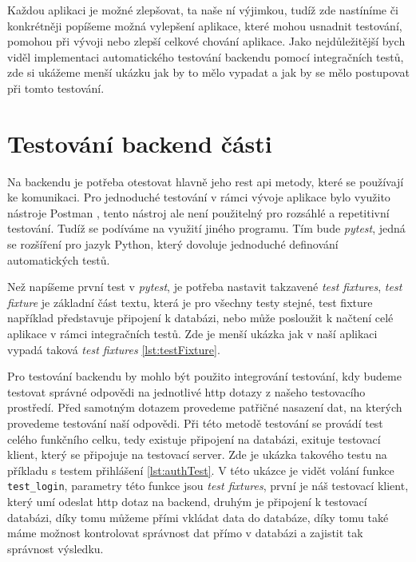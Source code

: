 Každou aplikaci je možné zlepšovat, ta naše ní výjimkou, tudíž zde nastíníme či konkrétněji popíšeme možná vylepšení aplikace,
které mohou usnadnit testování, pomohou při vývoji nebo zlepší celkové chování aplikace. Jako nejdůležitější bych viděl implementaci
automatického testování backendu pomocí integračních testů, zde si ukážeme menší ukázku jak by to mělo vypadat a jak by se mělo postupovat
při tomto testování.

\section{Testování backend části}

Na backendu je potřeba otestovat hlavně jeho \gls{rest} \gls{api} metody, které se používají ke komunikaci. Pro jednoduché
testování v rámci vývoje aplikace bylo využito nástroje Postman \cite{postmanSW}, tento nástroj ale není použitelný pro rozsáhlé
a repetitivní testování. Tudíž se podíváme na využití jiného programu. Tím bude \textit{pytest}, jedná se rozšíření pro jazyk Python,
který dovoluje jednoduché definování automatických testů.

Než napíšeme první test v \textit{pytest}, je potřeba nastavit takzavené \textit{test fixtures}, \textit{test fixture} je základní část
textu, která je pro všechny testy stejné, test fixture například představuje připojení k databázi, nebo může posloužit k načtení
celé aplikace v rámci integračních testů. Zde je menší ukázka jak v naší aplikaci vypadá taková \textit{test fixtures} \ref{lst:testFixture}.

Pro testování backendu by mohlo být použito integrování testování, kdy budeme testovat správné odpovědi na jednotlivé \gls{http} dotazy z našeho
testovacího prostředí. Před samotným dotazem provedeme patřičné nasazení dat, na kterých provedeme testování naší odpovědi. Při této metodě
testování se provádí test celého funkčního celku, tedy existuje připojení na databázi, exituje testovací
klient, který se připojuje na testovací server. Zde je ukázka takového testu na příkladu s testem přihlášení \ref{lst:authTest}. V této ukázce
je vidět volání funkce \texttt{test\_login}, parametry této funkce jsou \textit{test fixtures}, první je náš testovací klient, který umí odeslat
\gls{http} dotaz na backend, druhým je připojení k testovací databázi, díky tomu můžeme přími vkládat data do databáze, díky tomu také máme
možnost kontrolovat správnost dat přímo v databázi a zajistit tak správnost výsledku.

